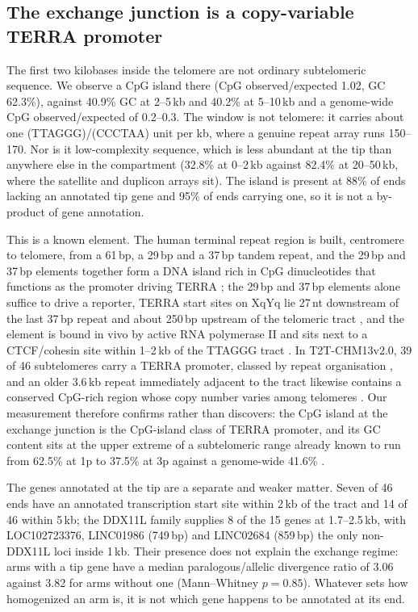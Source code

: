 \documentclass[pdflatex,mathphys]{jnl}
\begin{document}
\subsection*{The exchange junction is a copy-variable TERRA promoter}

The first two kilobases inside the telomere are not ordinary subtelomeric sequence. We observe a
CpG island there (CpG observed/expected 1.02, GC 62.3\%), against 40.9\% GC at 2--5\,kb and 40.2\%
at 5--10\,kb and a genome-wide CpG observed/expected of 0.2--0.3. The window is not telomere: it
carries about one (TTAGGG)/(CCCTAA) unit per kb, where a genuine repeat array runs 150--170. Nor is
it low-complexity sequence, which is less abundant at the tip than anywhere else in the compartment
(32.8\% at 0--2\,kb against 82.4\% at 20--50\,kb, where the satellite and duplicon arrays sit). The
island is present at 88\% of ends lacking an annotated tip gene and 95\% of ends carrying one, so it
is not a by-product of gene annotation.

This is a known element. The human terminal repeat region is built, centromere to telomere, from a
61\,bp, a 29\,bp and a 37\,bp tandem repeat, and the 29\,bp and 37\,bp elements together form a DNA
island rich in CpG dinucleotides that functions as the promoter driving TERRA
\cite{Brown1990,Nergadze2009,Farnung2010}; the 29\,bp and 37\,bp elements alone suffice to drive a
reporter, TERRA start sites on XqYq lie 27\,nt downstream of the last 37\,bp repeat and about
250\,bp upstream of the telomeric tract \cite{Nergadze2009}, and the element is bound in vivo by
active RNA polymerase II \cite{Nergadze2009} and sits next to a CTCF/cohesin site within 1--2\,kb of
the TTAGGG tract \cite{Deng2012}. In T2T-CHM13v2.0, 39 of 46 subtelomeres carry a TERRA promoter,
classed by repeat organisation \cite{Santagostino2025}, and an older 3.6\,kb repeat immediately
adjacent to the tract likewise contains a conserved CpG-rich region whose copy number varies among
telomeres \cite{Cheng1991}. Our measurement therefore confirms rather than discovers: the CpG island
at the exchange junction is the CpG-island class of TERRA promoter, and its GC content sits at the
upper extreme of a subtelomeric range already known to run from 62.5\% at 1p to 37.5\% at 3p against
a genome-wide 41.6\% \cite{Riethman2004}.

The genes annotated at the tip are a separate and weaker matter. Seven of 46 ends have an annotated
transcription start site within 2\,kb of the tract and 14 of 46 within 5\,kb; the DDX11L family
supplies 8 of the 15 genes at 1.7--2.5\,kb, with LOC102723376, LINC01986 (749\,bp) and LINC02684
(859\,bp) the only non-DDX11L loci inside 1\,kb. Their presence does not explain the exchange
regime: arms with a tip gene have a median paralogous/allelic divergence ratio of 3.06 against 3.82
for arms without one (Mann--Whitney $p = 0.85$). Whatever sets how homogenized an arm is, it is not
which gene happens to be annotated at its end.
\end{document}

